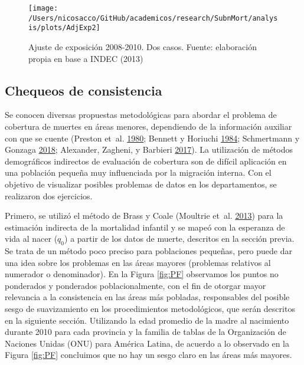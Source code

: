 \documentclass[12pt,spanish,]{article}
\begin{document}
\begin{figure}

{\centering \texttt{[image: /Users/nicosacco/GitHub/academicos/research/SubnMort/analysis/plots/AdjExp2]} 

}

\caption{Ajuste de exposición 2008-2010. Dos casos. Fuente: elaboración propia en base a INDEC (2013)}\label{fig:AdjExp}
\end{figure}

\hypertarget{chequeos-de-consistencia}{%
\subsection{Chequeos de consistencia}\label{chequeos-de-consistencia}}

Se conocen diversas propuestas metodológicas para abordar el problema de
cobertura de muertes en áreas menores, dependiendo de la información
auxiliar con que se cuente (Preston et~al.
\protect\hyperlink{ref-Preston1980}{1980}; Bennett y Horiuchi
\protect\hyperlink{ref-Bennett_Horiuchi_1984}{1984}; Schmertmann y
Gonzaga \protect\hyperlink{ref-Schmertmann2018}{2018}; Alexander,
Zagheni, y Barbieri \protect\hyperlink{ref-Alexander2017}{2017}). La
utilización de métodos demográficos indirectos de evaluación de
cobertura son de difícil aplicación en una población pequeña muy
influenciada por la migración interna. Con el objetivo de visualizar
posibles problemas de datos en los departamentos, se realizaron dos
ejercicios.

Primero, se utilizó el método de Brass y Coale (Moultrie et~al.
\protect\hyperlink{ref-Moultrie}{2013}) para la estimación indirecta de
la mortalidad infantil y se mapeó con la esperanza de vida al nacer
(\(q_0\)) a partir de los datos de muerte, descritos en la sección
previa. Se trata de un método poco preciso para poblaciones pequeñas,
pero puede dar una idea sobre los problemas en las áreas mayores
(problemas relativos al numerador o denominador). En la Figura
\ref{fig:PF} observamos los puntos no ponderados y ponderados
poblacionalmente, con el fin de otorgar mayor relevancia a la
consistencia en las áreas más pobladas, responsables del posible sesgo
de suavizamiento en los procedimientos metodológicos, que serán
descritos en la siguiente sección. Utilizando la edad promedio de la
madre al nacimiento durante 2010 para cada provincia y la familia de
tablas de la Organización de Naciones Unidas (ONU) para América Latina,
de acuerdo a lo observado en la Figura \ref{fig:PF} concluimos que no
hay un sesgo claro en las áreas más mayores.
\end{document}

